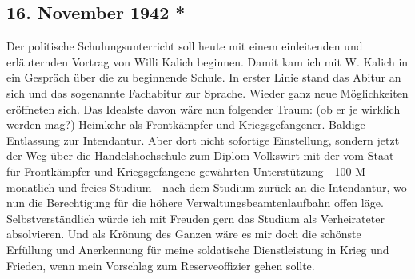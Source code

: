 \subsection{16. November 1942 *}

Der politische Schulungsunterricht soll heute mit einem einleitenden und erl\"{a}uternden Vortrag von Willi Kalich beginnen.
Damit kam ich mit W. Kalich in ein Gespr\"{a}ch \"{u}ber die zu beginnende Schule.
In erster Linie stand das Abitur an sich und das sogenannte Fachabitur zur Sprache.
Wieder ganz neue M\"{o}glichkeiten er\"{o}ffneten sich.
Das Idealste davon w\"{a}re nun folgender Traum: (ob er je wirklich werden mag?) Heimkehr als Frontk\"{a}mpfer und Kriegsgefangener.
Baldige Entlassung zur Intendantur.
Aber dort nicht sofortige Einstellung, sondern jetzt der Weg \"{u}ber die Handelshochschule zum Diplom-Volkswirt mit der vom Staat f\"{u}r Frontk\"{a}mpfer und Kriegsgefangene gew\"{a}hrten Unterst\"{u}tzung - 100 M monatlich und freies Studium - nach dem Studium zur\"{u}ck an die Intendantur, wo nun die Berechtigung f\"{u}r die h\"{o}here Verwaltungsbeamtenlaufbahn offen l\"{a}ge.
Selbstverst\"{a}ndlich w\"{u}rde ich mit Freuden gern das Studium als Verheirateter absolvieren.
Und als Kr\"{o}nung des Ganzen w\"{a}re es mir doch die sch\"{o}nste Erf\"{u}llung und Anerkennung f\"{u}r meine soldatische Dienstleistung in Krieg und Frieden, wenn mein Vorschlag zum Reserveoffizier gehen sollte.

\clearpage
